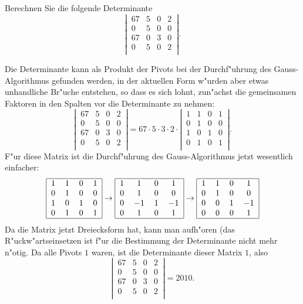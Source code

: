Berechnen Sie die folgende Determinante
\[
\left|\,\begin{matrix}
67&5&0&2\\
0&5&0&0\\
67&0&3&0\\
0&5&0&2\\
\end{matrix}\,\right|.
\]

\begin{loesung}
Die Determinante kann als Produkt der Pivots bei der Durchf"uhrung des
Gauss-Algorithmus gefunden werden, in der aktuellen Form w"urden aber
etwas unhandliche Br"uche entstehen, so dass es sich lohnt, zun"achst
die gemeinsamen Faktoren in den Spalten vor die Determinante zu nehmen:
\[
\left|\,\begin{matrix}
67&5&0&2\\
0&5&0&0\\
67&0&3&0\\
0&5&0&2\\
\end{matrix}\,\right|
=
67\cdot5\cdot3\cdot 2\cdot
\left|\,\begin{matrix}
1&1&0&1\\
0&1&0&0\\
1&0&1&0\\
0&1&0&1\\
\end{matrix}\,\right|.
\]
F"ur diese Matrix ist die Durchf"uhrung des Gauss-Algorithmus jetzt
wesentlich einfacher:
\[
\begin{tabular}{|cccc|}
\hline
1&1&0&1\\
0&1&0&0\\
1&0&1&0\\
0&1&0&1\\
\hline
\end{tabular}
\rightarrow
\begin{tabular}{|cccc|}
\hline
1&1&0&1\\
0&1&0&0\\
0&$-1$&1&$-1$\\
0&1&0&1\\
\hline
\end{tabular}
\rightarrow
\begin{tabular}{|cccc|}
\hline
1&1&0&1\\
0&1&0&0\\
0&0&1&$-1$\\
0&0&0&1\\
\hline
\end{tabular}
\]
Da die Matrix jetzt Dreiecksform hat, kann man aufh"oren
(das R"uckw"artseinsetzen ist f"ur die Bestimmung der
Determinante nicht mehr n"otig. Da alle Pivots $1$ waren, ist
die Determinante dieser Matrix $1$, also
\[
\left|\,\begin{matrix}
67&5&0&2\\
0&5&0&0\\
67&0&3&0\\
0&5&0&2\\
\end{matrix}\,\right|=2010.
\]
\end{loesung}

